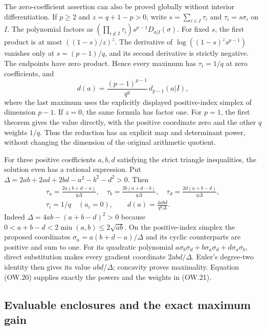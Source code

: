 The zero-coefficient assertion can also be proved globally without
interior differentiation. If $p\ge2$ and $z=q+1-p>0$, write
$s=\sum_{i\in I}\tau_i$ and $\tau_i=s\sigma_i$ on $I$.
The polynomial factors as
$(\prod_{i\notin I}\tau_i)s^{p-1}D_{a|I}(\sigma)$.
For fixed $s$, the first product is at most $((1-s)/z)^z$.
The derivative of $\log((1-s)^zs^{p-1})$ vanishes only at
$s=(p-1)/q$, and its second derivative is strictly negative.
The endpoints have zero product. Hence every maximum has
$\tau_i=1/q$ at zero coefficients, and
\[
 d(a)=\frac{(p-1)^{p-1}}{q^q}\,d_{p-1}(a|I),           \tag{OW.20}
\]
where the last maximum uses the explicitly displayed positive-index
simplex of dimension $p-1$. If $z=0$, the same formula has factor
one. For $p=1$, the first theorem gives the value directly, with
the positive coordinate zero and the other $q$ weights $1/q$.
Thus the reduction has an explicit map and determinant power,
without changing the dimension of the original arithmetic quotient.

For three positive coefficients $a,b,d$ satisfying the strict
triangle inequalities, the solution even has a rational expression.
Put $\Delta=2ab+2ad+2bd-a^2-b^2-d^2>0$. Then
\[
 \begin{gathered}
 \tau_a=\frac{2a(b+d-a)}{q\Delta},\quad
 \tau_b=\frac{2b(a+d-b)}{q\Delta},\quad
 \tau_d=\frac{2d(a+b-d)}{q\Delta},\\
 \tau_i=1/q\quad(a_i=0),\qquad
 \boxed{d(a)=\frac{4abd}{q^q\Delta}.}
 \end{gathered}                                           \tag{OW.21}
\]
Indeed $\Delta=4ab-(a+b-d)^2>0$ because
$0<a+b-d<2\min(a,b)\le2\sqrt{ab}$.
On the positive-index simplex the proposed coordinates
$\sigma_a=a(b+d-a)/\Delta$ and its cyclic counterparts are
positive and sum to one. For its quadratic polynomial
$a\sigma_b\sigma_d+b\sigma_a\sigma_d+d\sigma_a\sigma_b$,
direct substitution makes every gradient coordinate $2abd/\Delta$.
Euler's degree-two identity then gives its value $abd/\Delta$;
concavity proves maximality. Equation (OW.20) supplies exactly
the powers and the weights in (OW.21).

\subsection{Evaluable enclosures and the exact maximum gain}

